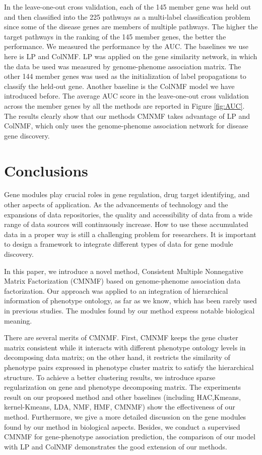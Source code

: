 \documentclass{bmcart}
\begin{document}
 In the leave-one-out cross validation, each of the 145 member gene was held out and then classified into the 225 pathways as a multi-label classification problem since some of the disease genes are
members of multiple pathways. The higher the target pathways in the ranking of the 145 member genes, the better the performance. We measured the performance by the AUC. The baselines we use here is LP and ColNMF. LP was applied on the gene similarity network, in which the data be used was measured by genome-phenome association matrix. The other 144 member genes was used as the initialization of label propagations to classify the held-out gene. Another baseline is the ColNMF model we have introduced before. The average AUC score in the leave-one-out cross validation across the  member genes by all the methods are reported in Figure \ref{fig:AUC}. The results clearly show that our methods CMNMF takes advantage of LP and ColNMF, which only uses the genome-phenome association network for disease gene discovery.

\section*{Conclusions}
Gene modules play crucial roles in gene regulation, drug target identifying, and other aspects of application. As the advancements of technology and the expansions of data repositories, the quality and accessibility of data from a wide range of data sources will continuously increase. How to use these accumulated data in a proper way is still a challenging problem for researchers. It is important to design a framework to integrate different types of data for gene module discovery.

In this paper, we introduce a novel method, Consistent Multiple Nonnegative Matrix Factorization (CMNMF) based on genome-phenome association data factorization. Our approach was applied to an integration of hierarchical information of phenotype ontology, as far as we know, which has been rarely used in previous studies. The modules found by our method express notable biological meaning.

There are several merits of CMNMF. First, CMNMF keeps the gene cluster matrix consistent while it interacts with different phenotype ontology levels in decomposing data matrix; on the other hand, it restricts the similarity of phenotype pairs expressed in phenotype cluster matrix to satisfy the hierarchical structure. To achieve a better clustering results, we introduce sparse regularization on gene and phenotype decomposing matrix. The experiments result on our proposed method and other baselines (including HAC,Kmeans, kernel-Kmeans, LDA, NMF, HMF, CMNMF) show the effectiveness of our method. Furthermore, we give a more detailed discussion on the gene modules found by our method in biological aspects. Besides, we conduct a supervised CMNMF for gene-phenotype association prediction, the comparison of our model with LP and ColNMF demonstrates the good extension of our methods.
\end{document}
